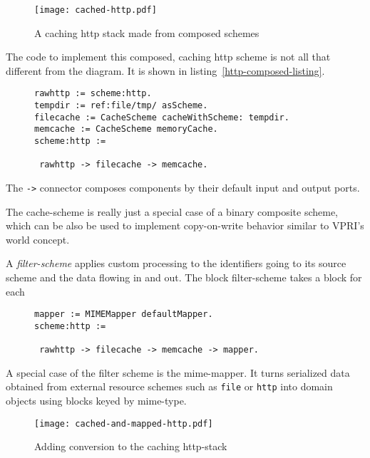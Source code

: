 \documentclass[preprint,authoryear]{acm_proc_article-sp}
\begin{document}
\begin{figure}[htbp]
\label{http-cached}
\begin{center}
\texttt{[image: cached-http.pdf]}
\caption{A caching http stack made from composed schemes}
\end{center}
\end{figure}

The code to implement this composed, caching http scheme is not all 
that different from the diagram.  It is shown in listing~\ref{http-composed-listing}.

\begin{figure}[htbp]
\begin{lstlisting}[style=L,label=http-composed-listing,caption=Code for caching http stack.]
rawhttp := scheme:http.
tempdir := ref:file/tmp/ asScheme.
filecache := CacheScheme cacheWithScheme: tempdir.
memcache := CacheScheme memoryCache.
scheme:http := 

 rawhttp -> filecache -> memcache.
\end{lstlisting}
\end{figure}

The {\tt ->} connector composes components by their default input
and output ports.

The cache-scheme is really just a special case of a binary composite scheme,
which can be also be used to implement copy-on-write behavior similar to
VPRI's world concept\cite{vpriworlds}.

A {\em filter-scheme} applies custom processing to the identifiers going to
its source scheme and the data flowing in and out.  The block filter-scheme
takes a block for each 

\begin{figure}[htbp]
\begin{lstlisting}[style=L,label=http-cached-converted-listing,caption=Caching and converting.]
mapper := MIMEMapper defaultMapper.
scheme:http := 

 rawhttp -> filecache -> memcache -> mapper.
\end{lstlisting}
\end{figure}


 A special case of the 
filter scheme is the mime-mapper.  It turns serialized data obtained from
external resource schemes such as {\tt file} or {\tt http} into domain objects
using blocks keyed by mime-type.  

\begin{figure}[htbp]
\caption{Adding conversion to the caching http-stack}
\label{http-cached-converted}
\begin{center}
\texttt{[image: cached-and-mapped-http.pdf]}
\end{center}
\end{figure}
\end{document}
